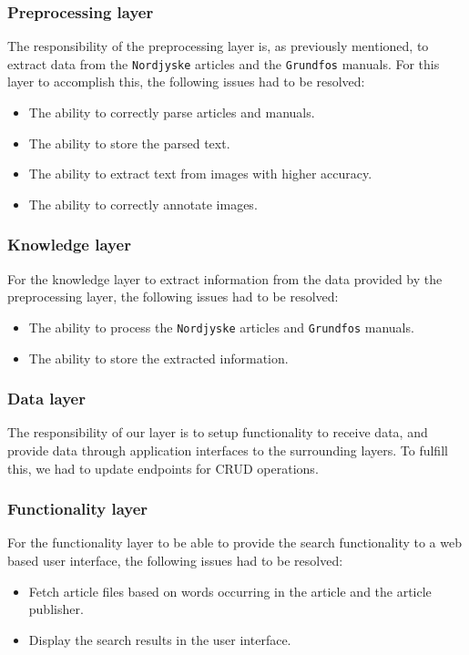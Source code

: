 \subsubsection*{Preprocessing layer}
The responsibility of the preprocessing layer is, as previously mentioned, to extract data from the \texttt{Nordjyske} articles and the \texttt{Grundfos} manuals. For this layer to accomplish this, the following issues had to be resolved:
\begin{itemize}
    \item The ability to correctly parse articles and manuals.
    \item The ability to store the parsed text.
    \item The ability to extract text from images with higher accuracy.
    \item The ability to correctly annotate images.
\end{itemize}

\subsubsection*{Knowledge layer}
For the knowledge layer to extract information from the data provided by the preprocessing layer, the following issues had to be resolved:
\begin{itemize}
    \item The ability to process the \texttt{Nordjyske} articles and \texttt{Grundfos} manuals.
    \item The ability to store the extracted information.
\end{itemize}

\subsubsection*{Data layer}
The responsibility of our layer is to setup functionality to receive data, and provide data through application interfaces to the surrounding layers.
To fulfill this, we had to update endpoints for CRUD operations.

\subsubsection*{Functionality layer}
For the functionality layer to be able to provide the search functionality to a web based user interface, the following issues had to be resolved:
\begin{itemize}
    \item Fetch article files based on words occurring in the article and the article publisher.
    \item Display the search results in the user interface.
\end{itemize}